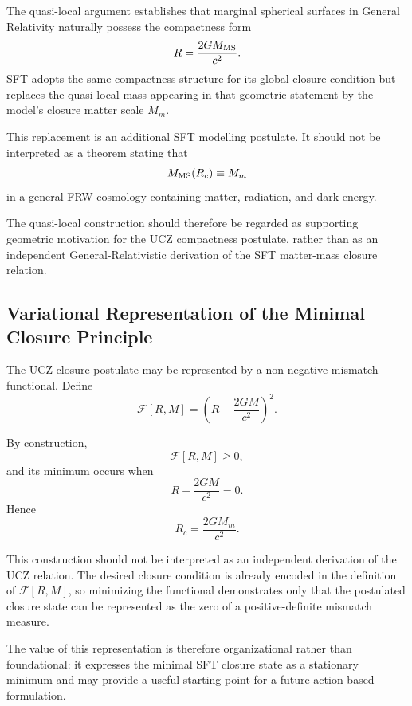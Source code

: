 \documentclass[12pt]{article}
\begin{document}
The quasi-local argument establishes that marginal spherical surfaces
in General Relativity naturally possess the compactness form
\[
R=\frac{2GM_{\rm MS}}{c^2}.
\]
SFT adopts the same compactness structure for its global closure
condition but replaces the quasi-local mass appearing in that geometric
statement by the model's closure matter scale $M_m$.

This replacement is an additional SFT modelling postulate. It should
not be interpreted as a theorem stating that
\[
M_{\rm MS}(R_c)\equiv M_m
\]
in a general FRW cosmology containing matter, radiation, and dark
energy.

The quasi-local construction should therefore be regarded as
supporting geometric motivation for the UCZ compactness postulate,
rather than as an independent General-Relativistic derivation of the
SFT matter-mass closure relation.


\subsection{Variational Representation of the Minimal Closure Principle}
\label{subsec:variational_closure_principle}

The UCZ closure postulate may be represented by a non-negative mismatch
functional. Define
\begin{equation}
\mathcal{F}[R,M]
=
\left(
R-\frac{2GM}{c^2}
\right)^2.
\label{eq:closure_functional}
\end{equation}

By construction,
\[
\mathcal{F}[R,M]\geq0,
\]
and its minimum occurs when
\begin{equation}
R-\frac{2GM}{c^2}=0.
\end{equation}
Hence
\begin{equation}
\boxed{
R_c=\frac{2GM_m}{c^2}.
}
\label{eq:closure_variational_result}
\end{equation}

This construction should not be interpreted as an independent
derivation of the UCZ relation. The desired closure condition is
already encoded in the definition of
$\mathcal{F}[R,M]$, so minimizing the functional demonstrates only
that the postulated closure state can be represented as the zero of a
positive-definite mismatch measure.

The value of this representation is therefore organizational rather
than foundational: it expresses the minimal SFT closure state as a
stationary minimum and may provide a useful starting point for a future
action-based formulation.
\end{document}
